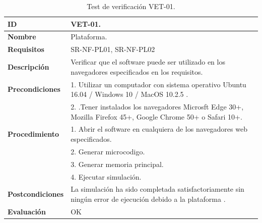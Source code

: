 \begin{center}
\begin{table}[htb]
\centering
\caption{Test de verificación VET-01.}
\begin{tabular}{@{}p{2.5cm} p{13cm}@{}} 
\toprule
\textbf{ID} 					& VET-01. \\
\midrule
\textbf{Nombre} 				& Plataforma. \\
\midrule
\textbf{Requisitos} 		& SR-NF-PL01, SR-NF-PL02\\
\midrule
\textbf{Descripción} 		& Verificar que el \gls{software} puede ser utilizado en los navegadores especificados en los requisitos. \\
\midrule
\textbf{Precondiciones}		& 1. Utilizar un computador con sistema operativo Ubuntu 16.04 / Windows 10 / MacOS 10.2.5 .\\
							& 2. .Tener instalados los navegadores Microsft Edge 30+, Mozilla Firefox 45+, Google Chrome 50+ o Safari 10+. \\
\midrule
\textbf{Procedimiento}			& 1. Abrir el \gls{software} en cualquiera de los navegadores web especificados. \\
							& 2. Generar \gls{microcodigo}.\\
							& 3. Generar memoria principal.\\
							& 4. Ejecutar simulación.\\
\midrule
\textbf{Postcondiciones} 		&  La simulación ha sido completada satisfactoriamente sin ningún error de ejecución debido a la plataforma .\\
\midrule
\textbf{Evaluación} 			& OK \\
\bottomrule
\end{tabular}
\label{tab:vet01}
\end{table}
\end{center}


